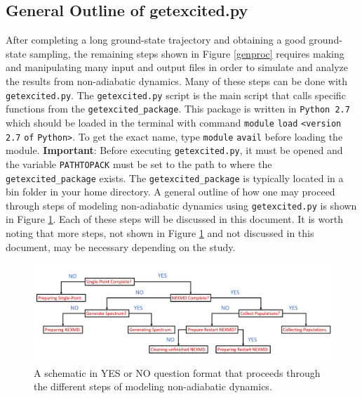 \documentclass[letterpaper,12pt,titlepage]{article}
\begin{document}
\subsection{General Outline of getexcited.py}
After completing a long ground-state trajectory and obtaining a good ground-state sampling, the remaining steps shown in Figure \ref{genproc} requires making and manipulating many input and output files in order to simulate and analyze the results from non-adiabatic dynamics.  Many of these steps can be done with \verb+getexcited.py+.  The \verb+getexcited.py+ script is the main script that calls specific functions from the \verb+getexcited_package+.  This package is written in \verb+Python 2.7+ which should be loaded in the terminal with command \verb+module+ \verb+load+ \verb+<version+ \verb+2.7+ \verb+of+ \verb+Python>+.  To get the exact name, type \verb+module+ \verb+avail+ before loading the module.  \textbf{Important}: Before executing \verb+getexcited.py+, it must be opened and the variable \verb+PATHTOPACK+ must be set to the path to where the \verb+getexcited_package+ exists.  The \verb+getexcited_package+ is typically located in a bin folder in your home directory.  A general outline of how one may proceed through steps of modeling non-adiabatic dynamics using \verb+getexcited.py+ is shown in Figure \ref{getexcited_outline}.  Each of these steps will be discussed in this document.  It is worth noting that more steps, not shown in Figure \ref{getexcited_outline} and not discussed in this document, may be necessary depending on the study.
\begin{figure}[t]
	\centering
	\includegraphics[scale=.27]{getexcited_structure.pdf}
	\caption{\small A schematic in YES or NO question format that proceeds through the different steps of modeling non-adiabatic dynamics.}
	\label{getexcited_outline}
\end{figure}
\end{document}
